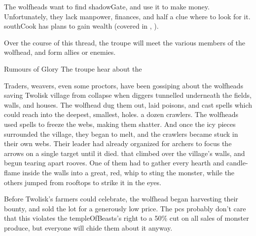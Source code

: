 \label{wolfHeads}

\noindent
The \glspl{wolfhead} want to find \gls{shadowGate}, and use it to make money.
Unfortunately, they lack manpower, finances, and half a clue where to look for it.
\Gls{southCook} has plans to gain wealth (covered in , ).

Over the course of this \gls{thread}, the troupe will meet the various members of the \gls{wolfhead}, and form allies or enemies.

{Rumours of Glory}%
{The troupe hear about the }%

Traders, \glspl{weaver}, even some \glspl{proctor}, have been gossiping about the \glspl{wolfhead} saving Twolisk \gls{village} from
\ifcase\thetemperature%
  collapse when \glspl{digger} tunnelled underneath the fields, walls, and houses.
  The \gls{wolfhead} dug them out, laid poisons, and cast \glspl{spell} which could reach into the deepest, smallest, holes.
\or%
  a dozen \glspl{crawler}.
  The \glspl{wolfhead} used \glspl{spell} to freeze the webs, making them shatter.
  And once the icy pieces surrounded the \gls{village}, they began to melt, and the \glspl{crawler} became stuck in their own webs.
  Their leader had already organized for archers to focus the arrows on a single target until it died.
\else%
   that climbed over the \gls{village}'s walls, and begun tearing apart rooves.
  One of them had  to gather every hearth and candle-flame inside the walls into a great, red, whip to sting the \gls{monster}, while the others jumped from rooftops to strike it in the eyes.
\fi%

Before Twolisk's farmers could celebrate, the \gls{wolfhead} began \gls{harvesting} their bounty, and sold the lot for a generously low price.
The \glspl{pc} probably don't care that this violates the \gls{templeOfBeasts}'s right to a 50\% cut on all sales of \gls{monster} produce, but everyone will chide them about it anyway.

